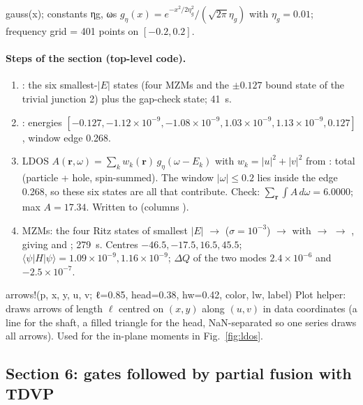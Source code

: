 \begin{function}{gauss(x); constants ηg, ωs}
$g_\eta(x) = e^{-x^2/2\eta_g^2}/(\sqrt{2\pi}\eta_g)$ with $\eta_g = 0.01$; frequency grid  = 401 points on $[-0.2, 0.2]$.
\end{function}

\paragraph{Steps of the section (top-level code).}
\begin{enumerate}
\item {}: the six smallest-$|E|$ states (four MZMs and the $\pm0.127$ bound state of the trivial
  junction 2) plus the gap-check state; 41~s.
\item {}: energies $[-0.127, -1.12\times10^{-9}, -1.08\times10^{-9}, 1.03\times10^{-9}, 1.13\times10^{-9}, 0.127]$, window edge 0.268.
\item LDOS $A(\mathbf r,\omega) = \sum_k w_k(\mathbf r)\,g_\eta(\omega - E_k)$ with $w_k = |u|^2+|v|^2$ from : total
  (particle + hole, spin-summed). The window $|\omega|\le0.2$ lies inside the edge 0.268, so these six states are all that contribute.
  Check: $\sum_{\mathbf r}\int A\,d\omega = 6.0000$; max $A = 17.34$. Written to  (columns ).
\item MZMs: the four Ritz states of smallest $|E|$ $\to$  ($\sigma = 10^{-3}$) $\to$  with
   $\to$  $\to$ , giving  and ; 279~s. Centres
  $-46.5, -17.5, 16.5, 45.5$; $\langle\psi|H|\psi\rangle = 1.09\times10^{-9}, 1.16\times10^{-9}$; $\Delta Q$ of the two modes
  $2.4\times10^{-6}$ and $-2.5\times10^{-7}$.
\end{enumerate}

\begin{function}{arrows!(p, x, y, u, v; ℓ=0.85, head=0.38, hw=0.42, color, lw, label)}
Plot helper: draws arrows of length $\ell$ centred on $(x,y)$ along $(u,v)$ in data coordinates (a line for the shaft, a filled triangle for the
head, NaN-separated so one series draws all arrows). Used for the in-plane moments in Fig.~\ref{fig:ldos}.
\end{function}

\subsection{Section 6: gates followed by partial fusion with TDVP}


